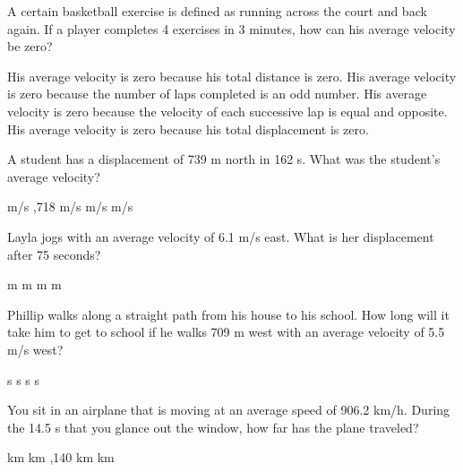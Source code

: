 \documentclass[]{exam}
\begin{document}
\begin{questions}
\begin{questions}
\clearpage





\question %
A certain basketball exercise is defined as running across the court and back again. If a player completes 4 exercises in 3 minutes, how can his average velocity be zero?
\begin{choices}
\choice His average velocity is zero because his total distance is zero.
\choice His average velocity is zero because the number of laps completed is an odd number.
\choice His average velocity is zero because the velocity of each successive lap is equal and opposite.
\CorrectChoice His average velocity is zero because his total displacement is zero.
\end{choices}

\question %
A student has a displacement of 739 m north in 162 s. What was the student's average velocity?

\begin{choices}
 m/s
,718 m/s
 m/s
 m/s
\end{choices}

\question %
Layla jogs with an average velocity of 6.1 m/s east. What is her displacement after 75 seconds?

\begin{choices}
 m
 m
 m
 m
\end{choices}

\question %
Phillip walks along a straight path from his house to his school. How long will it take him to get to school if he walks 709 m west with an average velocity of 5.5 m/s west?


\begin{choices}
 s
 s
 s
 s
\end{choices}



\question %
You sit in an airplane that is moving at an average speed of 906.2 km/h. During the 14.5 s that you glance out the window, how far has the plane traveled?

\begin{choices}
 km
 km
,140 km
 km
\end{choices}






\end{questions}
\end{questions}
\end{document}
